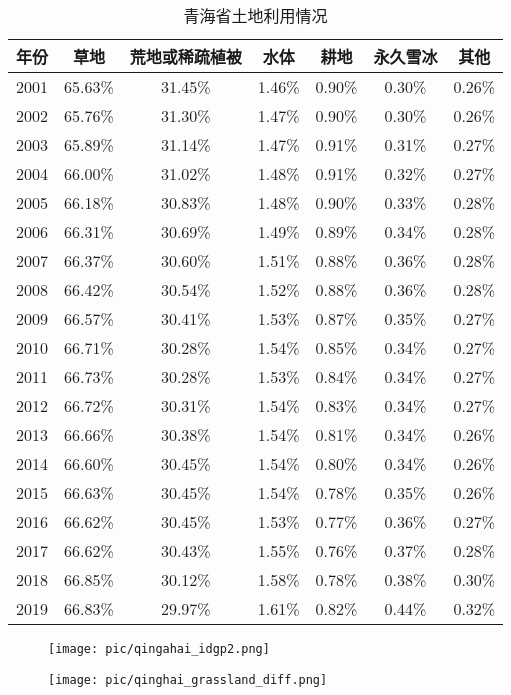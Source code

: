 \documentclass{article}
\begin{document}
		\begin{table}[H]
			\centering
			\caption{青海省土地利用情况}
			\begin{tabular}{|c|c|c|c|c|c|c|}
				\hline
				年份 & 草地 & 荒地或稀疏植被 & 水体 & 耕地 & 永久雪冰 & 其他 \\
				\hline
				2001 & 65.63\% & 31.45\% & 1.46\% & 0.90\% & 0.30\% & 0.26\% \\
				2002 & 65.76\% & 31.30\% & 1.47\% & 0.90\% & 0.30\% & 0.26\% \\
				2003 & 65.89\% & 31.14\% & 1.47\% & 0.91\% & 0.31\% & 0.27\% \\
				2004 & 66.00\% & 31.02\% & 1.48\% & 0.91\% & 0.32\% & 0.27\% \\
				2005 & 66.18\% & 30.83\% & 1.48\% & 0.90\% & 0.33\% & 0.28\% \\
				2006 & 66.31\% & 30.69\% & 1.49\% & 0.89\% & 0.34\% & 0.28\% \\
				2007 & 66.37\% & 30.60\% & 1.51\% & 0.88\% & 0.36\% & 0.28\% \\
				2008 & 66.42\% & 30.54\% & 1.52\% & 0.88\% & 0.36\% & 0.28\% \\
				2009 & 66.57\% & 30.41\% & 1.53\% & 0.87\% & 0.35\% & 0.27\% \\
				2010 & 66.71\% & 30.28\% & 1.54\% & 0.85\% & 0.34\% & 0.27\% \\
				2011 & 66.73\% & 30.28\% & 1.53\% & 0.84\% & 0.34\% & 0.27\% \\
				2012 & 66.72\% & 30.31\% & 1.54\% & 0.83\% & 0.34\% & 0.27\% \\
				2013 & 66.66\% & 30.38\% & 1.54\% & 0.81\% & 0.34\% & 0.26\% \\
				2014 & 66.60\% & 30.45\% & 1.54\% & 0.80\% & 0.34\% & 0.26\% \\
				2015 & 66.63\% & 30.45\% & 1.54\% & 0.78\% & 0.35\% & 0.26\% \\
				2016 & 66.62\% & 30.45\% & 1.53\% & 0.77\% & 0.36\% & 0.27\% \\
				2017 & 66.62\% & 30.43\% & 1.55\% & 0.76\% & 0.37\% & 0.28\% \\
				2018 & 66.85\% & 30.12\% & 1.58\% & 0.78\% & 0.38\% & 0.30\% \\
				2019 & 66.83\% & 29.97\% & 1.61\% & 0.82\% & 0.44\% & 0.32\% \\
				\hline
			\end{tabular}
		\end{table}
		
			\begin{figure}[H]  %
			\centering
			\texttt{[image: pic/qingahai\_idgp2.png]} %
		\end{figure}
						\begin{figure}[H]  %
			\centering
			\texttt{[image: pic/qinghai\_grassland\_diff.png]} %
		\end{figure}
		
\end{document}
